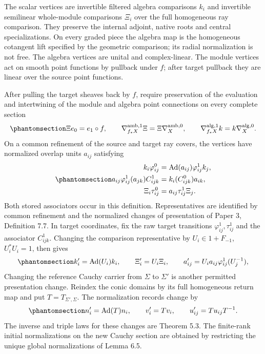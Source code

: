 \documentclass[
  english,
  11pt,
  reqno]{amsart}
\begin{document}
The scalar vertices are invertible filtered algebra comparisons \(k_i\)
and invertible semilinear whole-module comparisons \(\Xi_i\) over the
full homogeneous ray comparison. They preserve the internal adjoint,
native roots and central specializations. On every graded piece the
algebra map is the homogeneous cotangent lift specified by the geometric
comparison; its radial normalization is not free. The algebra vertices
are unital and complex-linear. The module vertices act on smooth point
functions by pullback under \(f\); after target pullback they are linear
over the source point functions.

After pulling the target sheaves back by \(f\), require preservation of
the evaluation and intertwining of the module and algebra point
connections on every complete section
\begin{equation}\protect\phantomsection\label{eq:global-full-arrow-point-tests}{
\Xi e_0=e_1\circ f,
\qquad
\nabla^{\mathrm{amb},1}_{f_*X}\Xi
 =\Xi\nabla^{\mathrm{amb},0}_X,
\qquad
\nabla^{\mathrm{alg},1}_{f_*X}k
 =k\nabla^{\mathrm{alg},0}_X.
}\end{equation} On a common refinement of the source and target ray
covers, the vertices have normalized overlap units \(a_{ij}\) satisfying
\begin{equation}\protect\phantomsection\label{eq:global-full-arrow-overlap-tests}{
\begin{aligned}
k_i\varphi^0_{ij}
 &=\operatorname{Ad}(a_{ij})\varphi^1_{ij}k_j,\\
a_{ij}\varphi^1_{ij}(a_{jk})C^1_{ijk}
 &=k_i(C^0_{ijk})a_{ik},\\
\Xi_i\tau^0_{ij}
 &=a_{ij}\tau^1_{ij}\Xi_j.
\end{aligned}
}\end{equation} Both stored associators occur in this definition.
Representatives are identified by common refinement and the normalized
changes of presentation of Paper 3, Definition 7.7. In target
coordinates, fix the raw target transitions
\(\varphi^1_{ij},\tau^1_{ij}\) and the associator \(C^1_{ijk}\).
Changing the comparison representative by \(U_i\in1+F_{-1}\),
\(U_i^*U_i=1\), then gives
\begin{equation}\protect\phantomsection\label{eq:global-full-arrow-normalized-change}{
k'_i=\operatorname{Ad}(U_i)k_i,
\qquad
\Xi'_i=U_i\Xi_i,
\qquad
a'_{ij}=U_i a_{ij}\varphi^1_{ij}(U_j^{-1}),
}\end{equation} Changing the reference Cauchy carrier from \(\Sigma\) to
\(\Sigma'\) is another permitted presentation change. Reindex the conic
domains by its full homogeneous return map and put
\(T=T_{\Sigma',\Sigma}\). The normalization records change by
\begin{equation}\protect\phantomsection\label{eq:global-carrier-presentation-change}{
n'_i=\operatorname{Ad}(T)n_i,
\qquad v'_i=T v_i,
\qquad u'_{ij}=T u_{ij}T^{-1}.
}\end{equation} The inverse and triple laws for these changes are
Theorem 5.3. The finite-rank initial normalizations on the new Cauchy
section are obtained by restricting the unique global normalizations of
Lemma 6.5.
\end{document}
